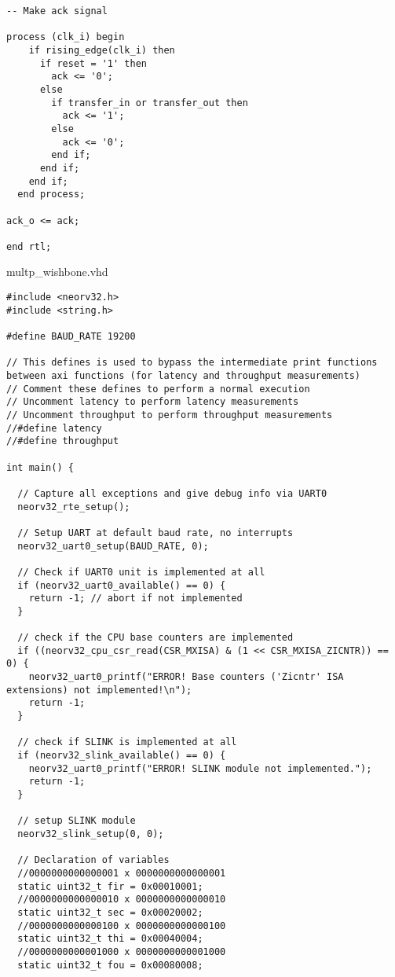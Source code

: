 \begin{code}
\begin{verbatim}
-- Make ack signal

process (clk_i) begin
    if rising_edge(clk_i) then
      if reset = '1' then
        ack <= '0';
      else
        if transfer_in or transfer_out then
          ack <= '1';
        else
          ack <= '0';
        end if;
      end if;
    end if;
  end process;

ack_o <= ack;

end rtl;
\end{verbatim}
\caption{multp\_wishbone.vhd}
\label{ap-cod:10}
\end{code}

\begin{code}
\begin{verbatim}
#include <neorv32.h>
#include <string.h>

#define BAUD_RATE 19200

// This defines is used to bypass the intermediate print functions between axi functions (for latency and throughput measurements)
// Comment these defines to perform a normal execution
// Uncomment latency to perform latency measurements
// Uncomment throughput to perform throughput measurements
//#define latency
//#define throughput

int main() {

  // Capture all exceptions and give debug info via UART0
  neorv32_rte_setup();

  // Setup UART at default baud rate, no interrupts
  neorv32_uart0_setup(BAUD_RATE, 0);

  // Check if UART0 unit is implemented at all
  if (neorv32_uart0_available() == 0) {
    return -1; // abort if not implemented
  }

  // check if the CPU base counters are implemented
  if ((neorv32_cpu_csr_read(CSR_MXISA) & (1 << CSR_MXISA_ZICNTR)) == 0) {
    neorv32_uart0_printf("ERROR! Base counters ('Zicntr' ISA extensions) not implemented!\n");
    return -1;
  }

  // check if SLINK is implemented at all
  if (neorv32_slink_available() == 0) {
    neorv32_uart0_printf("ERROR! SLINK module not implemented.");
    return -1;
  }

  // setup SLINK module
  neorv32_slink_setup(0, 0);

  // Declaration of variables 
  //0000000000000001 x 0000000000000001
  static uint32_t fir = 0x00010001;
  //0000000000000010 x 0000000000000010
  static uint32_t sec = 0x00020002;
  //0000000000000100 x 0000000000000100
  static uint32_t thi = 0x00040004;
  //0000000000001000 x 0000000000001000
  static uint32_t fou = 0x00080008;


\end{verbatim}
\end{code}
